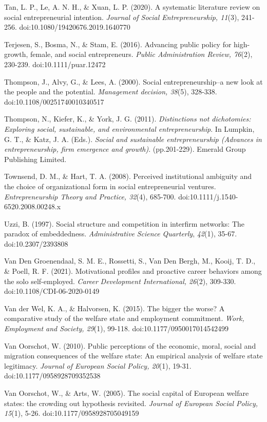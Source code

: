 \documentclass{article}
\begin{document}
Tan, L. P., Le, A. N. H., \& Xuan, L. P. (2020). A systematic literature review on social entrepreneurial intention. \emph{Journal of Social Entrepreneurship, 11}(3), 241-256. doi:10.1080/19420676.2019.1640770

Terjesen, S., Bosma, N., \& Stam, E. (2016). Advancing public policy for high-growth, female, and social entrepreneurs. \emph{Public Administration Review, 76}(2), 230-239. doi:10.1111/puar.12472

Thompson, J., Alvy, G., \& Lees, A. (2000). Social entrepreneurship--a new look at the people and the potential. \emph{Management decision, 38}(5), 328-338. doi:10.1108/00251740010340517

Thompson, N., Kiefer, K., \& York, J. G. (2011). \emph{Distinctions not dichotomies: Exploring social, sustainable, and environmental entrepreneurship}. In Lumpkin, G. T., \& Katz, J. A. (Eds.). \emph{Social and sustainable entrepreneurship (Advances in entrepreneurship, firm emergence and growth)}. (pp.201-229). Emerald Group Publishing Limited.

Townsend, D. M., \& Hart, T. A. (2008). Perceived institutional ambiguity and the choice of organizational form in social entrepreneurial ventures. \emph{Entrepreneurship Theory and Practice, 32}(4), 685-700. doi:10.1111/j.1540-6520.2008.00248.x

Uzzi, B. (1997). Social structure and competition in interfirm networks: The paradox of embeddedness. \emph{Administrative}\emph{ }\emph{Science}\emph{ }\emph{Quarterly}, \emph{42}(1), 35-67. doi:10.2307/2393808

Van Den Groenendaal, S. M. E., Rossetti, S., Van Den Bergh, M., Kooij, T. D., \& Poell, R. F. (2021). Motivational profiles and proactive career behaviors among the solo self-employed. \emph{Career}\emph{ Development International, 26}(2), 309-330. doi:10.1108/CDI-06-2020-0149

Van der Wel, K. A., \& Halvorsen, K. (2015). The bigger the worse? A comparative study of the welfare state and employment commitment. \emph{Work, Employment and Society, 29}(1), 99-118. doi:10.1177/0950017014542499

Van Oorschot, W. (2010). Public perceptions of the economic, moral, social and migration consequences of the welfare state: An empirical analysis of welfare state legitimacy. \emph{Journal of European Social Policy, 20}(1), 19-31. doi:10.1177/0958928709352538

Van Oorschot, W., \& Arts, W. (2005). The social capital of European welfare states: the crowding out hypothesis revisited. \emph{Journal of European Social Policy, 15}(1), 5-26. doi:10.1177/0958928705049159 
\end{document}
